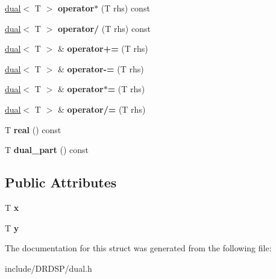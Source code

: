 \begin{DoxyCompactItemize}
\item 
\hypertarget{struct_d_r_d_s_p_1_1dual_a7c1a8b272bbdfcae34f0fa92af793e50}{\hyperlink{struct_d_r_d_s_p_1_1dual}{dual}$<$ T $>$ {\bfseries operator$\ast$} (T rhs) const }\label{struct_d_r_d_s_p_1_1dual_a7c1a8b272bbdfcae34f0fa92af793e50}

\item 
\hypertarget{struct_d_r_d_s_p_1_1dual_a53e0f807765195fe13edf7d23dd531ce}{\hyperlink{struct_d_r_d_s_p_1_1dual}{dual}$<$ T $>$ {\bfseries operator/} (T rhs) const }\label{struct_d_r_d_s_p_1_1dual_a53e0f807765195fe13edf7d23dd531ce}

\item 
\hypertarget{struct_d_r_d_s_p_1_1dual_a1652d072fb86733273e0d6aa39cee0fc}{\hyperlink{struct_d_r_d_s_p_1_1dual}{dual}$<$ T $>$ \& {\bfseries operator+=} (T rhs)}\label{struct_d_r_d_s_p_1_1dual_a1652d072fb86733273e0d6aa39cee0fc}

\item 
\hypertarget{struct_d_r_d_s_p_1_1dual_a6f8a9693191cf66a99e398f5c749ba9f}{\hyperlink{struct_d_r_d_s_p_1_1dual}{dual}$<$ T $>$ \& {\bfseries operator-\/=} (T rhs)}\label{struct_d_r_d_s_p_1_1dual_a6f8a9693191cf66a99e398f5c749ba9f}

\item 
\hypertarget{struct_d_r_d_s_p_1_1dual_a7d871dd2187ebd9696c4ba44fb08ff85}{\hyperlink{struct_d_r_d_s_p_1_1dual}{dual}$<$ T $>$ \& {\bfseries operator$\ast$=} (T rhs)}\label{struct_d_r_d_s_p_1_1dual_a7d871dd2187ebd9696c4ba44fb08ff85}

\item 
\hypertarget{struct_d_r_d_s_p_1_1dual_ab4b3104a03748d96eb06049edcdfb442}{\hyperlink{struct_d_r_d_s_p_1_1dual}{dual}$<$ T $>$ \& {\bfseries operator/=} (T rhs)}\label{struct_d_r_d_s_p_1_1dual_ab4b3104a03748d96eb06049edcdfb442}

\item 
\hypertarget{struct_d_r_d_s_p_1_1dual_a0d78f087bfcf470d9e68a52f15d48075}{T {\bfseries real} () const }\label{struct_d_r_d_s_p_1_1dual_a0d78f087bfcf470d9e68a52f15d48075}

\item 
\hypertarget{struct_d_r_d_s_p_1_1dual_af1d6079aacb711e6e05924bd131ff0d7}{T {\bfseries dual\-\_\-part} () const }\label{struct_d_r_d_s_p_1_1dual_af1d6079aacb711e6e05924bd131ff0d7}

\end{DoxyCompactItemize}
\subsection*{Public Attributes}
\begin{DoxyCompactItemize}
\item 
\hypertarget{struct_d_r_d_s_p_1_1dual_aa10eb23e32f77dacdc868c9a1df38b69}{T {\bfseries x}}\label{struct_d_r_d_s_p_1_1dual_aa10eb23e32f77dacdc868c9a1df38b69}

\item 
\hypertarget{struct_d_r_d_s_p_1_1dual_acc5892de3194e38d4c504467cfaa9da7}{T {\bfseries y}}\label{struct_d_r_d_s_p_1_1dual_acc5892de3194e38d4c504467cfaa9da7}

\end{DoxyCompactItemize}


The documentation for this struct was generated from the following file\-:\begin{DoxyCompactItemize}
\item 
include/\-D\-R\-D\-S\-P/dual.\-h\end{DoxyCompactItemize}

